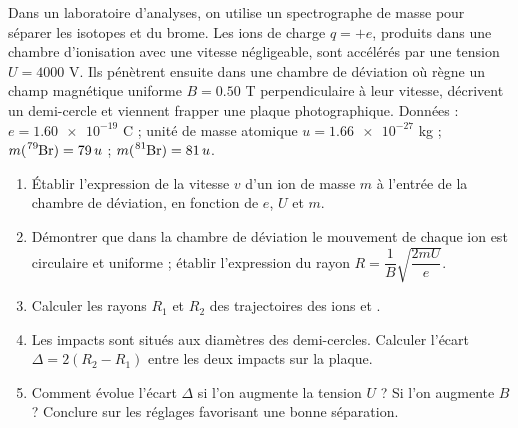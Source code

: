 \documentclass[11pt]{article}
\begin{document}
\begin{exercice}
Dans un laboratoire d'analyses, on utilise un spectrographe de masse pour séparer les isotopes  et  du brome. Les ions  de charge $q = +e$, produits dans une chambre d'ionisation avec une vitesse négligeable, sont accélérés par une tension $U = 4000$ V. Ils pénètrent ensuite dans une chambre de déviation où règne un champ magnétique uniforme $B = \num{0,50}$ T perpendiculaire à leur vitesse, décrivent un demi-cercle et viennent frapper une plaque photographique.
Données : $e = \num{1,60e-19}$ C ; unité de masse atomique $u = \num{1,66e-27}$ kg ; $m(\ce{^{79}Br}) = 79\,u$ ; $m(\ce{^{81}Br}) = 81\,u$.
\begin{enumerate}
\item Établir l'expression de la vitesse $v$ d'un ion de masse $m$ à l'entrée de la chambre de déviation, en fonction de $e$, $U$ et $m$.
\item Démontrer que dans la chambre de déviation le mouvement de chaque ion est circulaire et uniforme ; établir l'expression du rayon $R = \dfrac{1}{B}\sqrt{\dfrac{2mU}{e}}$.
\item Calculer les rayons $R_1$ et $R_2$ des trajectoires des ions  et .
\item Les impacts sont situés aux diamètres des demi-cercles. Calculer l'écart $\Delta = 2(R_2 - R_1)$ entre les deux impacts sur la plaque.
\item Comment évolue l'écart $\Delta$ si l'on augmente la tension $U$ ? Si l'on augmente $B$ ? Conclure sur les réglages favorisant une bonne séparation.
\end{enumerate}
\end{exercice}
\end{document}
